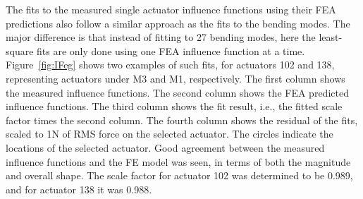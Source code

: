\documentclass [twoside,openbib,12pt]{article}
\begin{document}
The fits to the measured single actuator influence functions using
their FEA predictions also
follow a similar approach as the fits to the bending modes.
The major difference is that instead of fitting to 27 bending modes,
here the least-square fits are only done using one FEA influence
function at a time.
Figure~\ref{fig:IFeg} shows two examples of such fits, for actuators
102 and 138, representing actuators under M3 and M1, respectively.
The first column shows the measured influence functions.
The second column shows the FEA predicted influence functions.
The third column shows the fit result, i.e., the fitted scale factor
times the second column.
The fourth column shows the residual of the fits, scaled to 1N of
RMS force on the selected actuator.
The circles indicate the locations of the selected actuator. 
Good agreement between the measured influence functions and the FE
model was seen, in terms of both the magnitude and overall shape.
The scale factor for actuator 102 was determined to be 0.989, and for
actuator 138 it was 0.988.
\end{document}
